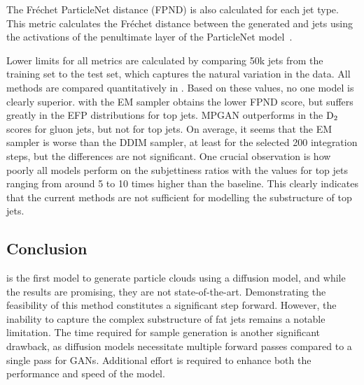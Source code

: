 The Fréchet ParticleNet distance (FPND) is also calculated for each jet type.
This metric calculates the Fréchet distance between the generated and \pythia jets using the activations of the penultimate layer of the ParticleNet model~\cite{MPGAN, ParticleNet}.

Lower limits for all metrics are calculated by comparing 50k jets from the training set to the test set, which captures the natural variation in the data.
All methods are compared quantitatively in .
Based on these values, no one model is clearly superior.
\pcjedi with the EM sampler obtains the lower FPND score, but suffers greatly in the EFP distributions for top jets.
MPGAN outperforms \pcjedi in the $\text{D}_2$ scores for gluon jets, but not for top jets.
On average, it seems that the EM sampler is worse than the DDIM sampler, at least for the selected 200 integration steps, but the differences are not significant.
One crucial observation is how poorly all models perform on the subjettiness ratios with the values for top jets ranging from around 5 to 10 times higher than the \pythia baseline.
This clearly indicates that the current methods are not sufficient for modelling the substructure of top jets.

\begin{table}[tp]
    \centering
    \caption{Quantitive comparison of the \pcjedi and MPGAN models for generating gluon and top jets.}
    \label{tab:combined_results}
    \renewcommand{\arraystretch}{1.5}
    \resizebox{\textwidth}{!}{%
        
    }
\end{table}

\subsection{Conclusion}

\pcjedi is the first model to generate particle clouds using a diffusion model, and while the results are promising, they are not state-of-the-art.
Demonstrating the feasibility of this method constitutes a significant step forward.
However, the inability to capture the complex substructure of fat jets remains a notable limitation.
The time required for sample generation is another significant drawback, as diffusion models necessitate multiple forward passes compared to a single pass for GANs.
Additional effort is required to enhance both the performance and speed of the model.

\FloatBarrier

